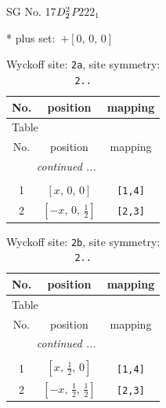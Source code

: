 \documentclass[fleqn,8pt]{jsarticle}
\begin{document}
\setcounter{MaxMatrixCols}{32}

\renewcommand{\tablename}{Table~}
\renewcommand{\figurename}{Figure~}
\begin{center}
\LARGE
SG No. 17\quad$D_{\rm 2}^{2}$\quad$P222_1$\quad[ orthorhombic ]
\end{center}
* plus set:\,\,\,$+\left[ 0,\, 0,\, 0 \right]$
\renewcommand{\arraystretch}{1.2}
\begin{longtable}{ccc}
\caption{Wyckoff site: {\tt 2a}, site symmetry: {\tt 2..}}
 \\
 \hline \hline
No. & position & mapping \\ \hline \endfirsthead

\multicolumn{2}{l}{\tablename\ \thetable{}} \\
 \hline \hline
No. & position & mapping \\ \hline \endhead

 \hline \hline
\multicolumn{2}{r}{\footnotesize\it continued ...} \\ \endfoot

 \hline \hline
\multicolumn{2}{r}{} \\ \endlastfoot

1 & $\left[ x,\, 0,\, 0 \right]$ & {\tt [1,4]} \\ \hline
2 & $\left[ - x,\, 0,\, \frac{1}{2} \right]$ & {\tt [2,3]} \\
\end{longtable}
\renewcommand{\arraystretch}{1.2}
\begin{longtable}{ccc}
\caption{Wyckoff site: {\tt 2b}, site symmetry: {\tt 2..}}
 \\
 \hline \hline
No. & position & mapping \\ \hline \endfirsthead

\multicolumn{2}{l}{\tablename\ \thetable{}} \\
 \hline \hline
No. & position & mapping \\ \hline \endhead

 \hline \hline
\multicolumn{2}{r}{\footnotesize\it continued ...} \\ \endfoot

 \hline \hline
\multicolumn{2}{r}{} \\ \endlastfoot

1 & $\left[ x,\, \frac{1}{2},\, 0 \right]$ & {\tt [1,4]} \\ \hline
2 & $\left[ - x,\, \frac{1}{2},\, \frac{1}{2} \right]$ & {\tt [2,3]} \\
\end{longtable}
\end{document}
